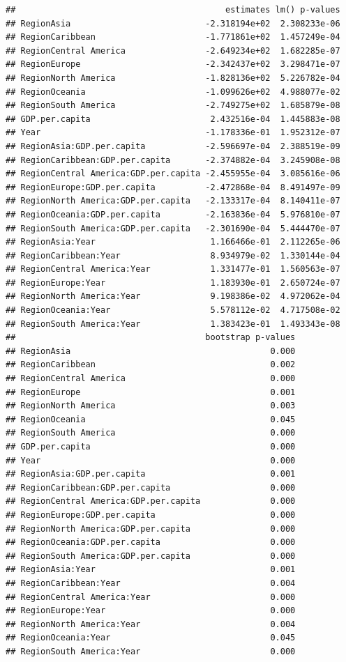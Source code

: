 \documentclass[11pt,]{article}
\begin{document}
\begin{verbatim}
##                                          estimates lm() p-values
## RegionAsia                           -2.318194e+02  2.308233e-06
## RegionCaribbean                      -1.771861e+02  1.457249e-04
## RegionCentral America                -2.649234e+02  1.682285e-07
## RegionEurope                         -2.342437e+02  3.298471e-07
## RegionNorth America                  -1.828136e+02  5.226782e-04
## RegionOceania                        -1.099626e+02  4.988077e-02
## RegionSouth America                  -2.749275e+02  1.685879e-08
## GDP.per.capita                        2.432516e-04  1.445883e-08
## Year                                 -1.178336e-01  1.952312e-07
## RegionAsia:GDP.per.capita            -2.596697e-04  2.388519e-09
## RegionCaribbean:GDP.per.capita       -2.374882e-04  3.245908e-08
## RegionCentral America:GDP.per.capita -2.455955e-04  3.085616e-06
## RegionEurope:GDP.per.capita          -2.472868e-04  8.491497e-09
## RegionNorth America:GDP.per.capita   -2.133317e-04  8.140411e-07
## RegionOceania:GDP.per.capita         -2.163836e-04  5.976810e-07
## RegionSouth America:GDP.per.capita   -2.301690e-04  5.444470e-07
## RegionAsia:Year                       1.166466e-01  2.112265e-06
## RegionCaribbean:Year                  8.934979e-02  1.330144e-04
## RegionCentral America:Year            1.331477e-01  1.560563e-07
## RegionEurope:Year                     1.183930e-01  2.650724e-07
## RegionNorth America:Year              9.198386e-02  4.972062e-04
## RegionOceania:Year                    5.578112e-02  4.717508e-02
## RegionSouth America:Year              1.383423e-01  1.493343e-08
##                                      bootstrap p-values
## RegionAsia                                        0.000
## RegionCaribbean                                   0.002
## RegionCentral America                             0.000
## RegionEurope                                      0.001
## RegionNorth America                               0.003
## RegionOceania                                     0.045
## RegionSouth America                               0.000
## GDP.per.capita                                    0.000
## Year                                              0.000
## RegionAsia:GDP.per.capita                         0.001
## RegionCaribbean:GDP.per.capita                    0.000
## RegionCentral America:GDP.per.capita              0.000
## RegionEurope:GDP.per.capita                       0.000
## RegionNorth America:GDP.per.capita                0.000
## RegionOceania:GDP.per.capita                      0.000
## RegionSouth America:GDP.per.capita                0.000
## RegionAsia:Year                                   0.001
## RegionCaribbean:Year                              0.004
## RegionCentral America:Year                        0.000
## RegionEurope:Year                                 0.000
## RegionNorth America:Year                          0.004
## RegionOceania:Year                                0.045
## RegionSouth America:Year                          0.000
\end{verbatim}
\end{document}
